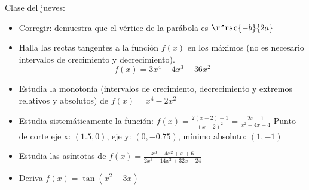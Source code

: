 \documentclass[palatino,nosec]{Docencia}
\begin{document}
Clase del jueves:

\begin{itemize}
	\item Corregir: demuestra que el vértice de la parábola es $\rfrac{-b}{2a}$
	\item Halla las rectas tangentes a la función $f(x)$ en los máximos (no es necesario intervalos de crecimiento y decrecimiento).
	\[
		f(x) = 3x^4-4x^3-36x^2
	\]
	\item Estudia la monotonía (intervalos de crecimiento, decrecimiento y extremos relativos y absolutos) de $f(x) = x^4-2x^2$
	
	\item Estudia sistemáticamente la función: $f(x) = \frac{2(x-2)+1}{(x-2)^2} = \frac{2x-1}{x^2-4x+4}$
	\subitem Punto de corte eje x: $(1.5,0)$, eje y: $(0,-0.75)$, mínimo absoluto: $(1,-1)$
	
	\item Estudia las asíntotas de $f(x) =\frac{x^3-4x^2+x+6}{2x^3-14x^2+32x-24}$
	
	\item Deriva $f(x) = \tan(x^2-3x)$
\end{itemize}

\printindex
\end{document}
